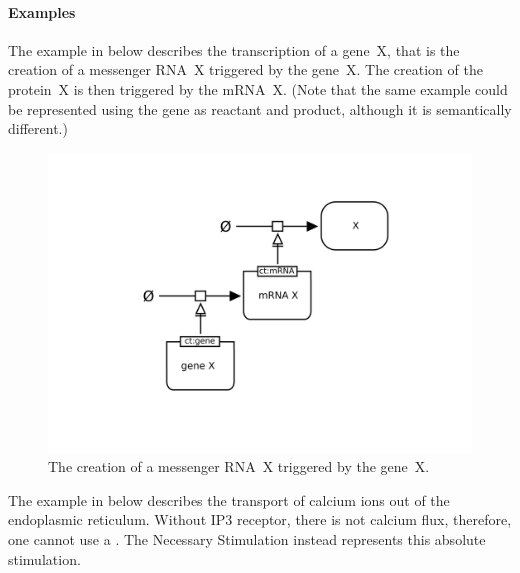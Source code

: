 \paragraph{Examples}

The example in  below describes the
transcription of a gene~X, that is the creation of a messenger RNA~X
triggered by the gene~X.  The creation of the protein~X is then
triggered by the mRNA~X.  (Note that the same example could be
represented using the gene as reactant and product, although it is
semantically different.)

\begin{figure}[H]
  \centering
  \includegraphics[scale = 0.4]{examples/necessary_stim-genetic}
  \caption{The creation of a messenger RNA~X triggered by the gene~X.}
  \label{fig:necessary_stim-gene}
\end{figure}


The example in  below describes the
transport of calcium ions out of the endoplasmic reticulum. Without
IP3 receptor, there is not calcium flux, therefore, one cannot use a
. The Necessary Stimulation instead represents this
absolute stimulation.

